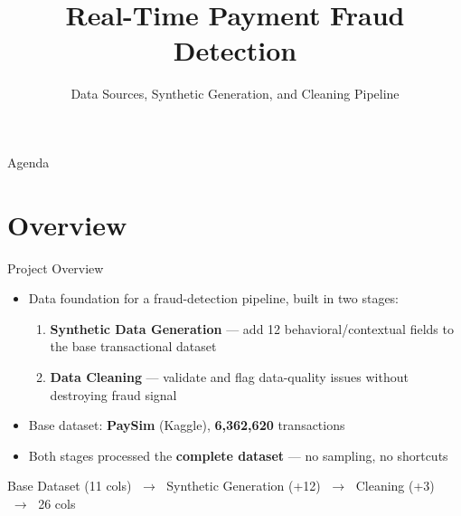 \documentclass[aspectratio=169]{beamer}
\title[Fraud Data Pipeline]{Real-Time Payment Fraud Detection}
\subtitle{Data Sources, Synthetic Generation, and Cleaning Pipeline}
\author{}
\institute{}
\date{}
\begin{document}
\begin{frame}
\titlepage
\end{frame}

\begin{frame}{Agenda}
\tableofcontents
\end{frame}

\section{Overview}

\begin{frame}{Project Overview}
\begin{itemize}
    \item Data foundation for a fraud-detection pipeline, built in two stages:
    \begin{enumerate}
        \item \textbf{Synthetic Data Generation} --- add 12 behavioral/contextual fields to the base transactional dataset
        \item \textbf{Data Cleaning} --- validate and flag data-quality issues without destroying fraud signal
    \end{enumerate}
    \item Base dataset: \textbf{PaySim} (Kaggle), \textbf{6,362,620} transactions
    \item Both stages processed the \textbf{complete dataset} --- no sampling, no shortcuts
\end{itemize}

\vspace{0.5cm}
\begin{center}
\Large
Base Dataset (11 cols) \(\;\rightarrow\;\) Synthetic Generation (+12) \(\;\rightarrow\;\) Cleaning (+3) \(\;\rightarrow\;\) 26 cols
\end{center}
\end{frame}
\end{document}
